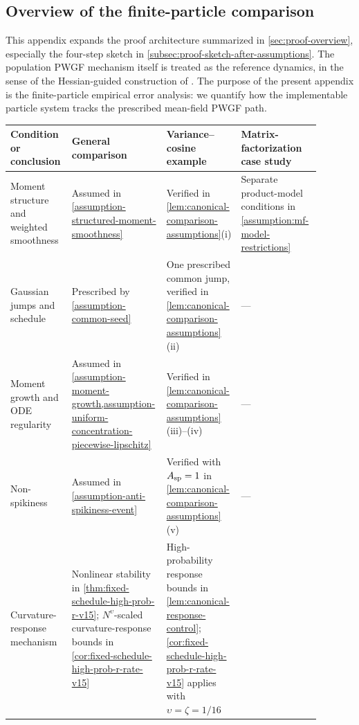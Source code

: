 \subsection{Overview of the finite-particle comparison}
\label{subsec:general-argument-overview}

This appendix expands the proof architecture summarized in
\cref{sec:proof-overview}, especially the
four-step sketch in \cref{subsec:proof-sketch-after-assumptions}.  The population PWGF mechanism itself is treated
as the reference dynamics, in the sense of the Hessian-guided construction of
\citet{yamamoto2025hessianguided}.  The purpose of the present appendix is the
finite-particle empirical error analysis: we quantify how the implementable
particle system tracks the prescribed mean-field PWGF path.

\begin{table}[t]
\centering
\footnotesize
\setlength{\tabcolsep}{3pt}
\renewcommand{\arraystretch}{1.12}
\begin{tabular}{>{\raggedright\arraybackslash}p{0.19\linewidth}
                >{\raggedright\arraybackslash}p{0.22\linewidth}
                >{\raggedright\arraybackslash}p{0.23\linewidth}
                >{\raggedright\arraybackslash}p{0.25\linewidth}}
\toprule
Condition or conclusion & General comparison & Variance--cosine example & Matrix-factorization case study \\
\midrule
Moment structure and weighted smoothness
& Assumed in \cref{assumption-structured-moment-smoothness}
& Verified in \cref{lem:canonical-comparison-assumptions}(i)
& Separate product-model conditions in \cref{assumption:mf-model-restrictions} \\
Gaussian jumps and schedule
& Prescribed by \cref{assumption-common-seed}
& One prescribed common jump, verified in \cref{lem:canonical-comparison-assumptions}(ii)
& --- \\
Moment growth and ODE regularity
& Assumed in \cref{assumption-moment-growth,assumption-uniform-concentration-piecewise-lipschitz}
& Verified in \cref{lem:canonical-comparison-assumptions}(iii)--(iv)
& --- \\
Non-spikiness
& Assumed in \cref{assumption-anti-spikiness-event}
& Verified with $A_{\rm sp}=1$ in \cref{lem:canonical-comparison-assumptions}(v)
& --- \\
Curvature-response mechanism
& Nonlinear stability in \cref{thm:fixed-schedule-high-prob-r-v15}; \(N^\upsilon\)-scaled curvature-response bounds in \cref{cor:fixed-schedule-high-prob-r-rate-v15}
& High-probability response bounds in \cref{lem:canonical-response-control}; \cref{cor:fixed-schedule-high-prob-r-rate-v15} applies with \(\upsilon=\zeta=1/16\)

\end{tabular}
\end{table}
